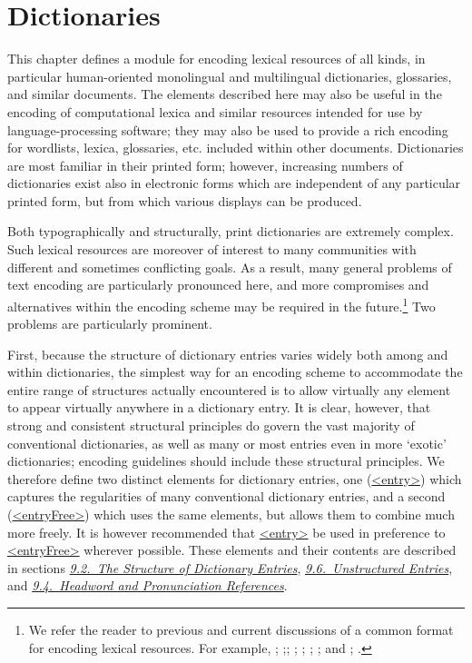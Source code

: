 
\section[{Dictionaries}]{Dictionaries}\label{DI}\par
This chapter defines a module for encoding lexical resources of all kinds, in particular human-oriented monolingual and multilingual dictionaries, glossaries, and similar documents. The elements described here may also be useful in the encoding of computational lexica and similar resources intended for use by language-processing software; they may also be used to provide a rich encoding for wordlists, lexica, glossaries, etc. included within other documents. Dictionaries are most familiar in their printed form; however, increasing numbers of dictionaries exist also in electronic forms which are independent of any particular printed form, but from which various displays can be produced. \par
Both typographically and structurally, print dictionaries are extremely complex. Such lexical resources are moreover of interest to many communities with different and sometimes conflicting goals. As a result, many general problems of text encoding are particularly pronounced here, and more compromises and alternatives within the encoding scheme may be required in the future.\footnote{We refer the reader to previous and current discussions of a common format for encoding lexical resources. For example, \cite{DI-BIBL-1}; \cite{DI-BIBL-2};\cite{DI-BIBL-3}; \cite{DI-BIBL-4}; \cite{DI-BIBL-5}; \cite{DI-BIBL-6}; \cite{DI-BIBL-7}; and \cite{DI-BIBL-8}; \cite{DI-BIBL-9}.} Two problems are particularly prominent.\par
First, because the structure of dictionary entries varies widely both among and within dictionaries, the simplest way for an encoding scheme to accommodate the entire range of structures actually encountered is to allow virtually any element to appear virtually anywhere in a dictionary entry. It is clear, however, that strong and consistent structural principles do govern the vast majority of conventional dictionaries, as well as many or most entries even in more ‘exotic’ dictionaries; encoding guidelines should include these structural principles. We therefore define two distinct elements for dictionary entries, one (\hyperref[TEI.entry]{<entry>}) which captures the regularities of many conventional dictionary entries, and a second (\hyperref[TEI.entryFree]{<entryFree>}) which uses the same elements, but allows them to combine much more freely. It is however recommended that \hyperref[TEI.entry]{<entry>} be used in preference to \hyperref[TEI.entryFree]{<entryFree>} wherever possible. These elements and their contents are described in sections \textit{\hyperref[DIEN]{9.2.\ The Structure of Dictionary Entries}}, \textit{\hyperref[DIFR]{9.6.\ Unstructured Entries}}, and \textit{\hyperref[DIHW]{9.4.\ Headword and Pronunciation References}}.\par
